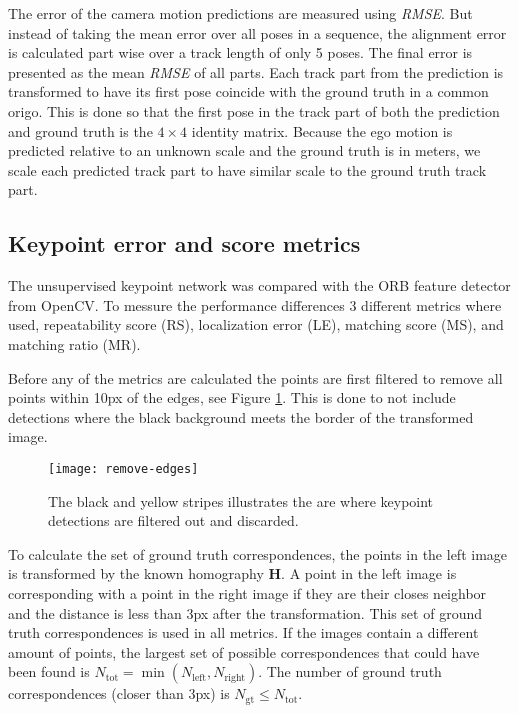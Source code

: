 The error of the camera motion predictions are measured using \textit{RMSE}. But instead of taking the mean error over all poses in a sequence, the alignment error is calculated part wise over a track length of only 5 poses. The final error is presented as the mean \textit{RMSE} of all parts. Each track part from the prediction is transformed to have its first pose coincide with the ground truth in a common origo. This is done so that the first pose in the track part of both the prediction and ground truth is the ${4\times 4}$ identity matrix. Because the ego motion is predicted relative to an unknown scale and the ground truth is in meters, we scale each predicted track part to have similar scale to the ground truth track part.

\subsection{Keypoint error and score metrics}\label{sec:keypointmetrics}

The unsupervised keypoint network was compared with the ORB feature detector from OpenCV. To messure the performance differences 3 different metrics where used, repeatability score (RS), localization error (LE), matching score (MS), and matching ratio (MR).

Before any of the metrics are calculated the points are first filtered to remove all points within 10px of the edges, see Figure \ref{fig:remove-edges}. This is done to not include detections where the black background meets the border of the transformed image.

\begin{figure}[H]
	\centering
	\texttt{[image: remove-edges]}
	\caption{The black and yellow stripes illustrates the are where keypoint detections are filtered out and discarded.}
	\label{fig:remove-edges}
\end{figure}

To calculate the set of ground truth correspondences, the points in the left image is transformed by the known homography $\textbf{H}$. A point in the left image is corresponding with a point in the right image if they are their closes neighbor and the distance is less than 3px after the transformation. This set of ground truth correspondences is used in all metrics. If the images contain a different amount of points, the largest set of possible correspondences that could have been found is $N_{\mathrm{tot}} = \min(N_{\mathrm{left}}, N_{\mathrm{right}})$. The number of ground truth correspondences (closer than 3px) is $N_{\mathrm{gt}} \le N_{\mathrm{tot}}$.

